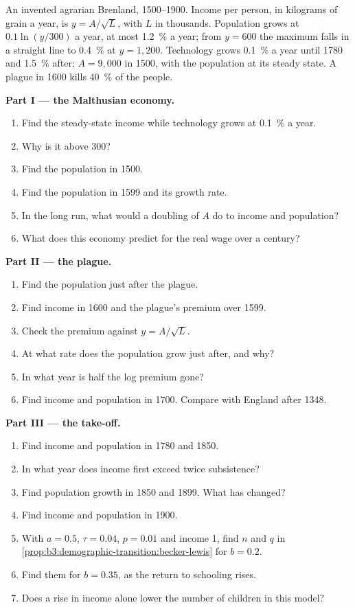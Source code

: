 \begin{problem}\label{pb:b3:demographic-transition:factories}
An invented agrarian Brenland, 1500--1900. Income per person, in kilograms of grain a
year, is $y = A/\sqrt{L}$, with $L$ in thousands. Population grows at $0.1\ln(y/300)$ a year, at most 1.2~\% a year;
from $y = 600$ the maximum falls in a straight line to 0.4~\% at $y = 1{,}200$. Technology grows 0.1~\% a year until 1780
and 1.5~\% after; $A = 9{,}000$ in 1500, with the population at its steady state. A plague in 1600 kills
40~\% of the people. %

\medskip\noindent\textbf{Part I --- the Malthusian economy.}
\begin{enumerate}
\item Find the steady-state income while technology grows at 0.1~\% a year.
\item Why is it above 300?
\item Find the population in 1500.
\item Find the population in 1599 and its growth rate.
\item In the long run, what would a doubling of $A$ do to income and population?
\item What does this economy predict for the real wage over a century?
\end{enumerate}

\medskip\noindent\textbf{Part II --- the plague.}
\begin{enumerate}[resume]
\item Find the population just after the plague.
\item Find income in 1600 and the plague's premium over 1599.
\item Check the premium against $y = A/\sqrt{L}$.
\item At what rate does the population grow just after, and why?
\item In what year is half the log premium gone?
\item Find income and population in 1700. Compare with England after 1348.
\end{enumerate}

\medskip\noindent\textbf{Part III --- the take-off.}
\begin{enumerate}[resume]
\item Find income and population in 1780 and 1850.
\item In what year does income first exceed twice subsistence?
\item Find population growth in 1850 and 1899. What has changed?
\item Find income and population in 1900.
\item With $a = 0.5$, $\tau = 0.04$, $p = 0.01$ and income 1, find $n$ and $q$ in \cref{prop:b3:demographic-transition:becker-lewis} for $b = 0.2$.
\item Find them for $b = 0.35$, as the return to schooling rises.
\item Does a rise in income alone lower the number of children in this model?
\end{enumerate}


\end{problem}
